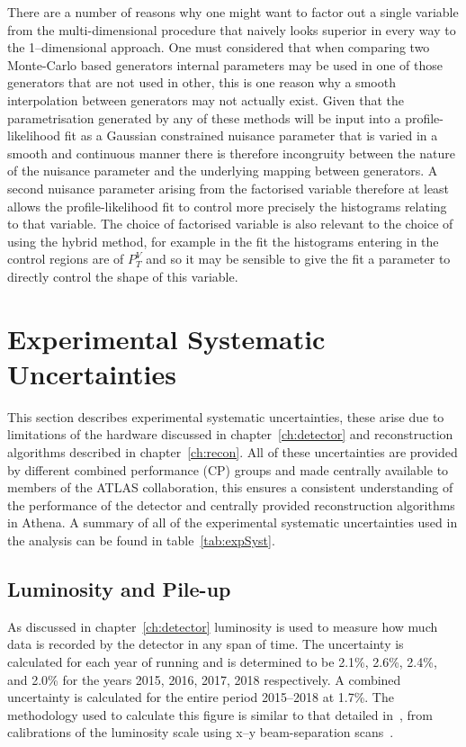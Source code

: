 There are a number of reasons why one might want to factor out a single variable
from the multi-dimensional procedure that naively looks superior in every way to
the 1--dimensional approach. One must considered that when comparing two
Monte-Carlo based generators internal parameters may be used in one of those
generators that are not used in other, this is one reason why a smooth
interpolation between generators may not actually exist. Given that the
parametrisation generated by any of these methods will be input into a
profile-likelihood fit as a Gaussian constrained nuisance parameter that is
varied in a smooth and continuous manner there is therefore incongruity between
the nature of the nuisance parameter and the underlying mapping between
generators. A second nuisance parameter arising from the factorised variable
therefore at least allows the profile-likelihood fit to control more precisely
the histograms relating to that variable. The choice of factorised variable is
also relevant to the choice of using the hybrid method, for example in the fit
the histograms entering in the control regions are of $P_T^V$ and so it may be
sensible to give the fit a parameter to directly control the shape of this
variable.

\section{Experimental Systematic Uncertainties}
\label{sec:experimental-systs}

This section describes experimental systematic uncertainties, these arise due to
limitations of the hardware discussed in chapter~\ref{ch:detector} and
reconstruction algorithms described in chapter~\ref{ch:recon}. All of these
uncertainties are provided by different combined performance (CP) groups and
made centrally available to members of the ATLAS collaboration, this ensures a
consistent understanding of the performance of the detector and centrally
provided reconstruction algorithms in Athena. A summary of all of the
experimental systematic uncertainties used in the analysis can be found in
table~\ref{tab:expSyst}.


\subsection{Luminosity and Pile-up}
\label{sec:lumisys}

As discussed in chapter~\ref{ch:detector} luminosity is used to measure how much
data is recorded by the detector in any span of time. The uncertainty is
calculated for each year of running and is determined to be  2.1\%, 2.6\%,
2.4\%, and 2.0\% for the years 2015, 2016, 2017, 2018 respectively. A combined
uncertainty is calculated for the entire period 2015--2018 at 1.7\%. The
methodology used to calculate this figure is similar to that detailed
in~\cite{lumiDetermine}, from calibrations of the luminosity scale using x--y
beam-separation scans~\cite{lumiTwiki}.

